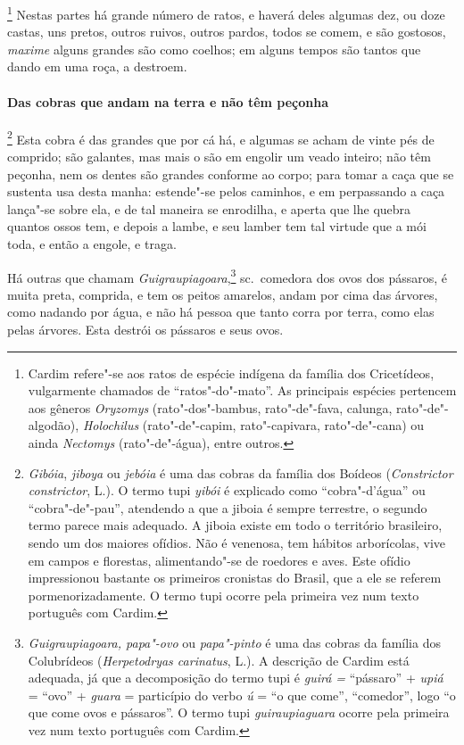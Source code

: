 \footnote{ Cardim refere"-se aos ratos de espécie
indígena da família dos Cricetídeos, vulgarmente chamados de ``ratos"-do"-mato''. 
As principais espécies pertencem aos gêneros
\textit{Oryzomys} (rato"-dos"-bambus, rato"-de"-fava, calunga,
rato"-de"-algodão), \textit{Holochilus} (rato"-de"-capim, rato"-capivara,
rato"-de"-cana) ou ainda \textit{Nectomys} (rato"-de"-água), entre
outros.} Nestas partes há grande número de ratos, e
haverá deles algumas dez, ou doze castas, uns pretos, outros ruivos,
outros pardos, todos se comem, e são gostosos, \textit{maxime} alguns
grandes são como coelhos; em alguns tempos são tantos que dando em uma
roça, a destroem. 

\paragraph{Das cobras que andam na terra e não têm peçonha}

\footnote{ \textit{Gibóia}, \textit{jiboya} ou 
\textit{jebóia} é uma das cobras da família dos Boídeos 
(\textit{Constrictor constrictor}, L.). O termo tupi \textit{yibói} é
explicado como ``cobra"-d'água'' ou ``cobra"-de"-pau'', atendendo a que a
jiboia é sempre terrestre, o segundo termo parece mais adequado. A
jiboia existe em todo o território brasileiro, sendo um dos maiores
ofídios. Não é venenosa, tem hábitos arborícolas, vive em campos e
florestas, alimentando"-se de roedores e aves. Este ofídio impressionou
bastante os primeiros cronistas do Brasil, que a ele se referem
pormenorizadamente. O termo tupi ocorre pela primeira vez num texto
português com Cardim.} Esta cobra é das grandes que por cá há,
e algumas se acham de vinte pés de comprido; são galantes, mas mais o
são em engolir um veado inteiro; não têm peçonha, nem os dentes são
grandes conforme ao corpo; para tomar a caça que se sustenta usa desta
manha: estende"-se pelos caminhos, e em perpassando a caça lança"-se
sobre ela, e de tal maneira se enrodilha, e aperta que lhe quebra
quantos ossos tem, e depois a lambe, e seu lamber tem tal virtude que a
mói toda, e então a engole, e traga. 

 Há outras que chamam \textit{Guigraupiagoara},\footnote{ \textit{Guigraupiagoara, 
papa"-ovo} ou \textit{papa"-pinto} é uma das
cobras da família dos Colubrídeos (\textit{Herpetodryas carinatus}, L.). 
A descrição de Cardim está adequada, já que a decomposição do
termo tupi é \textit{guirá =} ``pássaro'' + \textit{upiá} = ``ovo'' +
\textit{guara} = particípio do verbo \textit{ú} = ``o que come'',
``comedor'', logo ``o que come ovos e pássaros''. O termo tupi
\textit{guiraupiaguara} ocorre pela primeira vez num texto português
com Cardim.} sc.~comedora dos ovos dos pássaros, é muita preta,
comprida, e tem os peitos amarelos, andam por cima das árvores, como
nadando por água, e não há pessoa que tanto corra por terra, como elas
pelas árvores. Esta destrói os pássaros e seus ovos.

